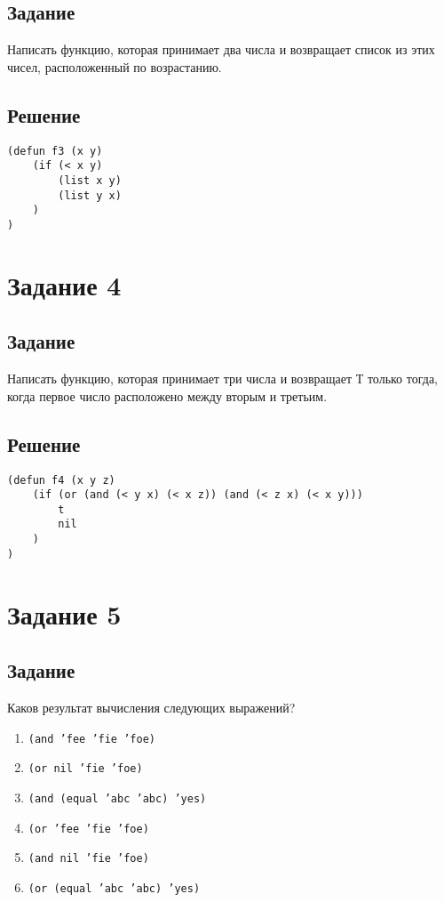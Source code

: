 \subsection*{Задание}
Написать функцию, которая принимает два числа и возвращает список из этих чисел, расположенный по возрастанию.

\subsection*{Решение}
\begin{code}
\begin{verbatim}
(defun f3 (x y)
	(if (< x y)
		(list x y)
		(list y x)
	)
)
\end{verbatim}
\end{code}


\section{Задание 4}
\subsection*{Задание}
Написать функцию, которая принимает три числа и возвращает Т только тогда, когда первое число расположено между вторым и третьим.

\subsection*{Решение}
\begin{code}
\begin{verbatim}
(defun f4 (x y z)
	(if (or (and (< y x) (< x z)) (and (< z x) (< x y)))
		t
		nil
	)
)
\end{verbatim}
\end{code}


\section{Задание 5}
\subsection*{Задание}
Каков результат вычисления следующих выражений?

\begin{enumerate}
	\item \texttt{(and 'fee 'fie 'foe)}
	\item \texttt{(or nil 'fie 'foe)}
	\item \texttt{(and (equal 'abc 'abc) 'yes)}
	\item \texttt{(or 'fee 'fie 'foe)}
	\item \texttt{(and nil 'fie 'foe)}
	\item \texttt{(or (equal 'abc 'abc) 'yes)}
\end{enumerate}

